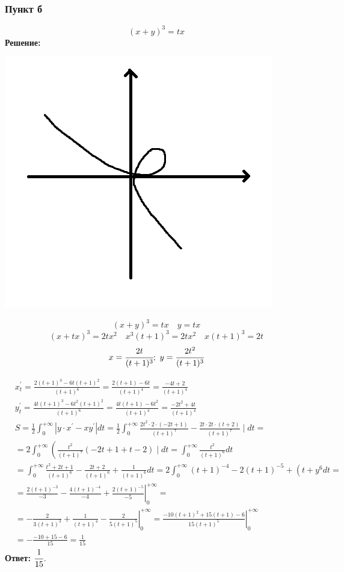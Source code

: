 \subsubsection*{Пункт б}
$$(x+y)^3=tx$$
\textbf{Решение:}
\begin{minipage}{0.3\textwidth}
\includegraphics[width=\linewidth]{pics/pic2.png}
\end{minipage}
\hfill
\begin{minipage}{0.6\textwidth}\raggedleft
$$(x+y)^3=tx \quad y = tx $$
$$(x+tx)^3=2tx^2 \quad x^3(t+1)^3 = 2tx^2 \quad x(t+1)^3=2t$$
$$x = \cfrac{2t}{(t+1)^3}; ~ y = \cfrac{2t^2}{(t+1)^3}$$
\end{minipage}
$
\begin{aligned}
& x_t^{\prime}=\frac{2(t+1)^3-6 t(t+1)^2}{(t+1)^6}=\frac{2(t+1)-6 t}{(t+1)^4}=\frac{-4 t+2}{(t+1)^4} \\
& y_t^{\prime}=\frac{4 t(t+1)^3-6 t^2(t+1)^2}{(t+1)^6}=\frac{4 t(t+1)-6 t^2}{(t+1)^4}=\frac{-2 t^2+4 t}{(t+1)^4} \\
& S=\frac{1}{2} \int_0^{+\infty}\left|y \cdot x^{\prime}-x y^{\prime}\right| d t=\frac{1}{2} \int_0^{+\infty} \frac{2 t^2 \cdot 2 \cdot(-2 t+1)}{(t+1)^7}-\frac{2 t \cdot 2 t \cdot(t+2)}{(t+1)^7} \mid d t= \\
&= 2 \int_0^{+\infty}\left(\frac{t^2}{(t+1)^7}(-2 t+1+t-2) \mid d t=\int_0^{+\infty} \frac{t^2}{(t+1)^6} d t\right. \\
&= \int_0^{+\infty} \frac{t^2+2 t+1}{(t+1)^6}-\frac{2 t+2}{(t+1)^6}+\frac{1}{(t+1)^6} d t=2 \int_0^{+\infty}(t+1)^{-4}-2(t+1)^{-5}+\left(t+y^6 d t=\right. \\
&= \frac{2(t+1)^{-3}}{-3}-\frac{4(t+1)^{-4}}{-4}+\left.\frac{2(t+1)^{-5}}{-5}\right|_0 ^{+\infty}= \\
&=-\frac{2}{3(t+1)^3}+\frac{1}{(t+1)^4}-\left.\frac{2}{5(t+1)^5}\right|_0 ^{+\infty}=\left.\frac{-10(t+1)^2+15(t+1)-6}{15(t+1)^5}\right|_0 ^{+\infty} \\
&=-\frac{-10+15-6}{15}=\frac{1}{15}
\end{aligned}
$
\textbf{Ответ:} $\cfrac{1}{15}$.

